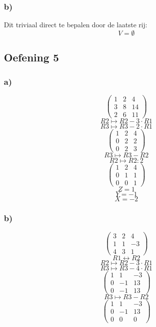 \documentclass[lineaire_algebra_oplossingen.tex]{subfiles}
\begin{document}
\subsubsection*{b)}
Dit triviaal direct te bepalen door de laatste rij:
\[
V=\emptyset
\]
\subsection{Oefening 5}
\subsubsection*{a)}
\[
\begin{pmatrix}
1 &  2 &  4\\
3 &  8 &  14\\
2 &  6 &  11
\end{pmatrix}
\]
\[ R2 \longmapsto R2 -3\cdot R1\]
\[ R3 \longmapsto R3 -2\cdot R1\]
\[
\begin{pmatrix}
1 &  2 &  4\\
0 &  2 &  2\\
0 &  2 &  3
\end{pmatrix}
\]
\[ R3 \longmapsto R3 - R2\]
\[ R2 \longmapsto R2 : 2\]
\[
\begin{pmatrix}
1 &  2 &  4\\
0 &  1 &  1\\
0 &  0 &  1
\end{pmatrix}
\]
\[ Z=1\]
\[ Y=-1\]
\[ X=-2\]

\subsubsection*{b)}
\[
\begin{pmatrix}
3 &  2 &  4\\
1 &  1 &  -3\\
4 &  3 &  1
\end{pmatrix}
\]
\[R1 \leftrightarrow R2\]
\[ R2 \longmapsto R2 -3\cdot R1\]
\[ R3 \longmapsto R3 -4\cdot R1\]
\[
\begin{pmatrix}
1 &  1 &  -3\\
0 &  -1 &  13\\
0 &  -1 &  13
\end{pmatrix}
\]
\[ R3 \longmapsto R3 - R2\]
\[
\begin{pmatrix}
1 &  1 &  -3\\
0 &  -1 &  13\\
0 &  0 &  0
\end{pmatrix}
\]
\end{document}
